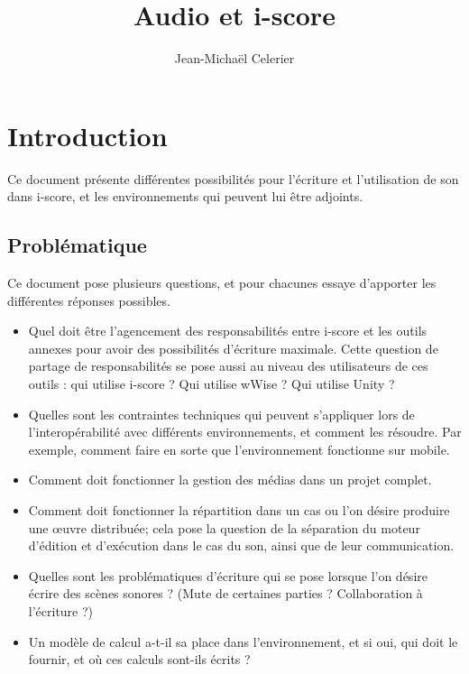 \documentclass[french,12pt,a4paper]{article}
\title{Audio et i-score}
\author{Jean-Michaël Celerier}
\begin{document}
\maketitle

\section{Introduction}
Ce document présente différentes possibilités 
pour l'écriture et l'utilisation de son dans i-score, 
et les environnements qui peuvent lui être adjoints.

\subsection{Problématique}
Ce document pose plusieurs questions, et pour chacunes essaye d'apporter les différentes réponses possibles.
\begin{itemize}
    \item Quel doit être l'agencement des responsabilités entre i-score et les outils annexes pour avoir des possibilités d'écriture maximale.
    Cette question de partage de responsabilités se pose aussi au niveau des utilisateurs de ces outils : qui utilise i-score ? Qui utilise wWise ? Qui utilise Unity ? 
    \item Quelles sont les contraintes techniques qui peuvent s'appliquer lors de l'interopérabilité avec différents environnements, et comment les résoudre. 
    Par exemple, comment faire en sorte que l'environnement fonctionne sur mobile.
    \item Comment doit fonctionner la gestion des médias dans un projet complet.
    \item Comment doit fonctionner la répartition dans un cas ou l'on désire produire une \oe uvre distribuée; cela pose la question de la séparation du moteur d'édition et d'exécution dans le cas du son, ainsi que de leur communication.
    \item Quelles sont les problématiques d'écriture qui se pose lorsque l'on désire écrire des scènes sonores ? (Mute de certaines parties ? Collaboration à l'écriture ?)
    \item Un modèle de calcul a-t-il sa place dans l'environnement, et si oui, qui doit le fournir, et où ces calculs sont-ils écrits ?
\end{itemize}

\end{document}
